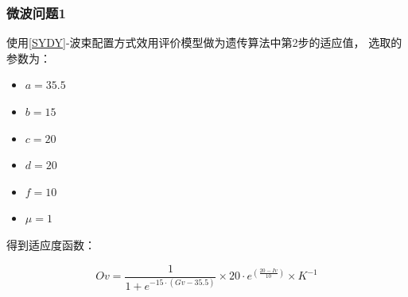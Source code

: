 \documentclass[UTF8,12pt]{ctexart}
\begin{document}
        \subsubsection{微波问题1}
        使用\ref{SYDY}-波束配置方式效用评价模型做为遗传算法中第2步的适应值，
        选取的参数为：
        \begin{itemize}
            \item $a=35.5$
            \item $b=15$
            \item $c=20$
            \item $d=20$
            \item $f=10$
            \item $μ = 1$
        \end{itemize}

        得到适应度函数：
        \begin{Large}
            $$Ov = {\frac{1}{1+e^{-15·(Gv-35.5)}}}
            ×20·e^{(\frac{20-Iv}{10})}×{K}^{-1}$$
        \end{Large}
        
\end{document}
